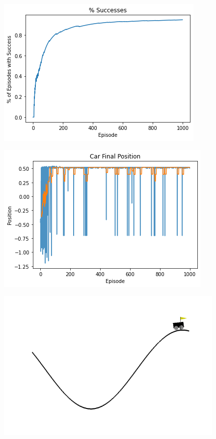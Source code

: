  \begin{figure}[H]
   \centering
     \includegraphics[scale=0.7]
     {templates/success2}
 \end{figure}

 \begin{figure}[H]
   \centering
     \includegraphics[scale=0.7]
     {templates/position2}
 \end{figure}

 \begin{figure}[H]
   \centering
     \includegraphics[scale=0.7]
     {templates/car2}
 \end{figure}

